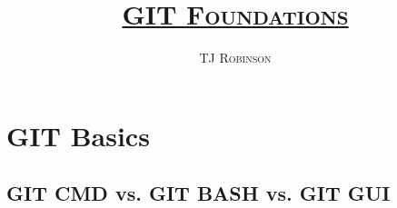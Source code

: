 \documentclass[a4paper,12pt]{book}
\begin{document}
\title{\underline{\scshape{GIT Foundations}}}
\author{\scshape{TJ Robinson}}
\maketitle

\chapter{GIT Basics}
\section{GIT CMD vs. GIT BASH vs. GIT GUI}
\end{document}
